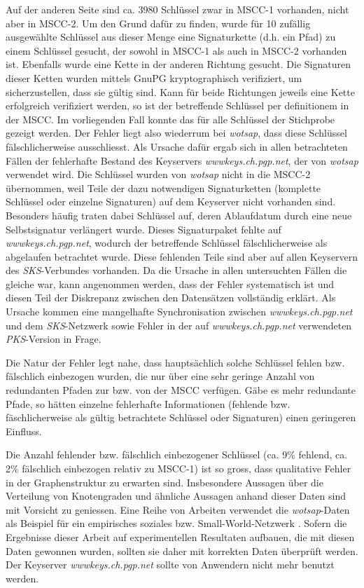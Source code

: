 Auf der anderen Seite sind ca. 3980 Schlüssel zwar in MSCC-1
vorhanden, nicht aber in MSCC-2. Um den Grund dafür zu finden, wurde
für 10 zufällig ausgewählte Schlüssel aus dieser Menge eine
Signaturkette (d.h. ein Pfad) zu einem Schlüssel gesucht, der sowohl
in MSCC-1 als auch in MSCC-2 vorhanden ist. Ebenfalls wurde eine Kette
in der anderen Richtung gesucht. Die Signaturen dieser Ketten wurden
mittels GnuPG kryptographisch verifiziert, um sicherzustellen, dass
sie gültig sind. Kann für beide Richtungen jeweils eine Kette
erfolgreich verifiziert werden, so ist der betreffende Schlüssel per
definitionem in der MSCC. Im vorliegenden Fall konnte das für alle
Schlüssel der Stichprobe gezeigt werden. Der Fehler liegt also
wiederrum bei \emph{wotsap}, dass diese Schlüssel fälschlicherweise
ausschliesst. Als Ursache dafür ergab sich in allen betrachteten
Fällen der fehlerhafte Bestand des Keyservers
\emph{wwwkeys.ch.pgp.net}, der von \emph{wotsap} verwendet wird. Die
Schlüssel wurden von \emph{wotsap} nicht in die MSCC-2 übernommen,
weil Teile der dazu notwendigen Signaturketten (komplette Schlüssel
oder einzelne Signaturen) auf dem Keyserver nicht vorhanden
sind. Besonders h\"aufig traten dabei Schl\"ussel auf, deren
Ablaufdatum durch eine neue Selbstsignatur verl\"angert wurde. Dieses
Signaturpaket fehlte auf \emph{wwwkeys.ch.pgp.net}, wodurch der
betreffende Schl\"ussel f\"alschlicherweise als abgelaufen betrachtet
wurde. Diese fehlenden Teile sind aber auf allen Keyservern des
\emph{SKS}-Verbundes %
vorhanden. Da die Ursache in allen untersuchten F\"allen die gleiche
war, kann angenommen werden, dass der Fehler systematisch ist und
diesen Teil der Diskrepanz zwischen den Datens\"atzen vollst\"andig
erkl\"art. Als Ursache kommen eine mangelhafte Synchronisation
zwischen \emph{wwwkeys.ch.pgp.net} und dem \emph{SKS}-Netzwerk sowie
Fehler in der auf \emph{wwwkeys.ch.pgp.net} verwendeten
\emph{PKS}-Version in Frage.

Die Natur der Fehler legt nahe, dass hauptsächlich solche Schlüssel
fehlen bzw. fälschlich einbezogen wurden, die nur über eine sehr
geringe Anzahl von redundanten Pfaden zur bzw. von der MSCC
verfügen. Gäbe es mehr redundante Pfade, so hätten einzelne
fehlerhafte Informationen (fehlende bzw. fäschlicherweise als gültig
betrachtete Schlüssel oder Signaturen) einen geringeren Einfluss.

Die Anzahl fehlender bzw. fälschlich einbezogener Schlüssel (ca. 9\%
fehlend, ca. 2\% fälschlich einbezogen relativ zu MSCC-1) ist so
gross, dass qualitative Fehler in der Graphenstruktur zu erwarten
sind. Insbesondere Aussagen über die Verteilung von Knotengraden und
ähnliche Aussagen anhand dieser Daten sind mit Vorsicht zu
geniessen. Eine Reihe von Arbeiten verwendet die \emph{wotsap}-Daten
als Beispiel für ein empirisches soziales bzw. Small-World-Netzwerk
\cite{Brondsema2006} \cite{Heikkila2009} \cite{Dell'Amico2007}. Sofern
die Ergebnisse dieser Arbeit auf experimentellen Resultaten aufbauen,
die mit diesen Daten gewonnen wurden, sollten sie daher mit korrekten
Daten überprüft werden. Der Keyserver \emph{wwwkeys.ch.pgp.net} sollte
von Anwendern nicht mehr benutzt werden.

